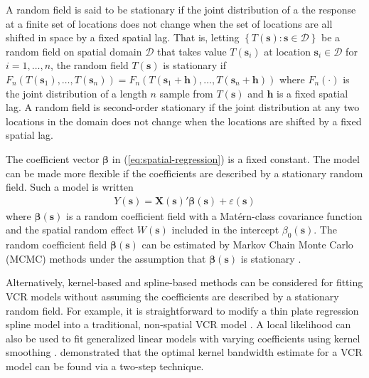 \documentclass[authoryear, review, 11pt]{elsarticle}
\begin{document}
	A random field is said to be stationary if the joint distribution of a the response at a finite set of locations does not change when the set of locations are all shifted in space by a fixed spatial lag. That is, letting $\left\{T(\bm{s}) : \bm{s} \in \mathcal{D}\right\}$ be a random field on spatial domain $\mathcal{D}$ that takes value $T(\bm{s}_i)$ at location $\bm{s}_i \in \mathcal{D}$ for $i = 1, \dots, n$, the random field $T(\bm{s})$ is stationary if $F_n\left(T(\bm{s}_1), \dots, T(\bm{s}_n)\right) = F_n\left(T(\bm{s}_1+\bm{h}), \dots, T(\bm{s}_n+\bm{h})\right)$ where $F_n(\cdot)$ is the joint distribution of a length $n$ sample from $T(\bm{s})$ and $\bm{h}$ is a fixed spatial lag. A random field is second-order stationary if the joint distribution at any two locations in the domain does not change when the locations are shifted by a fixed spatial lag.
	
	The coefficient vector $\bm{\beta}$ in (\ref{eq:spatial-regression}) is a fixed constant. The model can be made more flexible if the coefficients are described by a stationary random field. Such a model is written
\begin{align}\label{eq:SVCR-process}
    Y(\bm{s}) = \bm{X}(\bm{s})'\bm{\beta}(\bm{s}) + \varepsilon(\bm{s})
\end{align}
	where $\bm{\beta}(\bm{s})$ is a random coefficient field with a Mat\'{e}rn-class covariance function and the spatial random effect $W(\bm{s})$ included in the intercept $\beta_0(\bm{s})$. The random coefficient field $\bm{\beta}(\bm{s})$ can be estimated by Markov Chain Monte Carlo (MCMC) methods under the assumption that $\bm{\beta}(\bm{s})$ is stationary \citep{Gelfand:2003}.


	Alternatively, kernel-based and spline-based methods can be considered for fitting VCR models without assuming the coefficients are described by a stationary random field. For example, it is straightforward to modify a thin plate regression spline model into a traditional, non-spatial VCR model \citep{Wood:2006}. A local likelihood can also be used to fit generalized linear models with varying coefficients using kernel smoothing \citep{Loader:1999}. \cite{Fan:1999} demonstrated that the optimal kernel bandwidth estimate for a VCR model can be found via a two-step technique.
	
\end{document}
